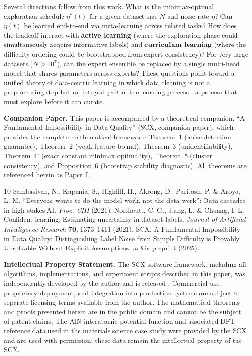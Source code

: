 \documentclass[12pt,a4paper]{article}
\begin{document}
Several directions follow from this work. What is the minimax-optimal exploration schedule $\eta^*(t)$ for a given dataset size $N$ and noise rate $\eta$? Can $\eta(t)$ be learned end-to-end via meta-learning across related tasks? How does the tradeoff interact with \textbf{active learning} (where the exploration phase could simultaneously acquire informative labels) and \textbf{curriculum learning} (where the difficulty ordering could be bootstrapped from expert consistency)? For very large datasets ($N > 10^7$), can the expert ensemble be replaced by a single multi-head model that shares parameters across experts? These questions point toward a unified theory of data-centric learning in which data cleaning is not a preprocessing step but an integral part of the learning process---a process that must explore before it can curate.

\begin{flushleft}
\textbf{Companion Paper.} This paper is accompanied by a theoretical companion, ``A Fundamental Impossibility in Data Quality'' (SCX, companion paper), which provides the complete mathematical framework: Theorem~1 (noise detection guarantee), Theorem~2 (weak-feature bound), Theorem~3 (unidentifiability), Theorem~4' (exact constant minimax optimality), Theorem~5 (cluster consistency), and Proposition~6 (bootstrap stability diagnostic). All theorems are referenced herein as Paper~I.

\end{flushleft}

\begin{thebibliography}{10}
 Sambasivan, N., Kapania, S., Highfill, H., Akrong, D., Paritosh, P. \& Aroyo, L. M. ``Everyone wants to do the model work, not the data work'': Data cascades in high-stakes AI. \textit{Proc. CHI} (2021).
 Northcutt, C. G., Jiang, L. \& Chuang, I. L. Confident learning: Estimating uncertainty in dataset labels. \textit{Journal of Artificial Intelligence Research} \textbf{70}, 1373--1411 (2021).
 SCX. A Fundamental Impossibility in Data Quality: Distinguishing Label Noise from Sample Difficulty is Provably Unsolvable Without Explicit Assumptions. arXiv preprint (2025).
\end{thebibliography}

\textbf{Intellectual Property Statement.}
The SCX software framework, including all algorithms, implementations, and experiment scripts described in this paper, was independently developed by the author and is released . Commercial use, proprietary deployment, and integration into production systems are subject to separate licensing terms available from the author. The mathematical theorems and proofs presented herein are in the public domain and cannot be the subject of patent claims. The AlN interatomic potential function and associated DFT reference data used in the materials science case study were provided by the SCX and are used with permission; these data remain the intellectual property of the SCX.
\end{document}
